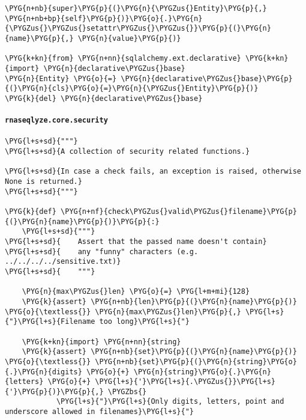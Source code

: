 \begin{Verbatim}[commandchars=\\\{\}]
        \PYG{n+nb}{super}\PYG{p}{(}\PYG{n}{\PYGZus{}Entity}\PYG{p}{,} \PYG{n+nb+bp}{self}\PYG{p}{)}\PYG{o}{.}\PYG{n}{\PYGZus{}\PYGZus{}setattr\PYGZus{}\PYGZus{}}\PYG{p}{(}\PYG{n}{name}\PYG{p}{,} \PYG{n}{value}\PYG{p}{)}

\PYG{k+kn}{from} \PYG{n+nn}{sqlalchemy.ext.declarative} \PYG{k+kn}{import} \PYG{n}{declarative\PYGZus{}base}
\PYG{n}{Entity} \PYG{o}{=} \PYG{n}{declarative\PYGZus{}base}\PYG{p}{(}\PYG{n}{cls}\PYG{o}{=}\PYG{n}{\PYGZus{}Entity}\PYG{p}{)}
\PYG{k}{del} \PYG{n}{declarative\PYGZus{}base}
\end{Verbatim}


\paragraph{\texttt{rnaseqlyze.core.security}}
\label{index-pdf4:rnaseqlyze-core-security}
\begin{Verbatim}[commandchars=\\\{\}]
\PYG{l+s+sd}{"""}
\PYG{l+s+sd}{A collection of security related functions.}

\PYG{l+s+sd}{In case a check fails, an exception is raised, otherwise None is returned.}
\PYG{l+s+sd}{"""}

\PYG{k}{def} \PYG{n+nf}{check\PYGZus{}valid\PYGZus{}filename}\PYG{p}{(}\PYG{n}{name}\PYG{p}{)}\PYG{p}{:}
    \PYG{l+s+sd}{"""}
\PYG{l+s+sd}{    Assert that the passed name doesn't contain}
\PYG{l+s+sd}{    any "funny" characters (e.g. ../../../../sensitive.txt)}
\PYG{l+s+sd}{    """}

    \PYG{n}{max\PYGZus{}len} \PYG{o}{=} \PYG{l+m+mi}{128}
    \PYG{k}{assert} \PYG{n+nb}{len}\PYG{p}{(}\PYG{n}{name}\PYG{p}{)} \PYG{o}{\textless{}} \PYG{n}{max\PYGZus{}len}\PYG{p}{,} \PYG{l+s}{"}\PYG{l+s}{Filename too long}\PYG{l+s}{"}

    \PYG{k+kn}{import} \PYG{n+nn}{string}
    \PYG{k}{assert} \PYG{n+nb}{set}\PYG{p}{(}\PYG{n}{name}\PYG{p}{)} \PYG{o}{\textless{}} \PYG{n+nb}{set}\PYG{p}{(}\PYG{n}{string}\PYG{o}{.}\PYG{n}{digits} \PYG{o}{+} \PYG{n}{string}\PYG{o}{.}\PYG{n}{letters} \PYG{o}{+} \PYG{l+s}{'}\PYG{l+s}{.\PYGZus{}}\PYG{l+s}{'}\PYG{p}{)}\PYG{p}{,} \PYGZbs{}
            \PYG{l+s}{"}\PYG{l+s}{Only digits, letters, point and underscore allowed in filenames}\PYG{l+s}{"}
\end{Verbatim}


